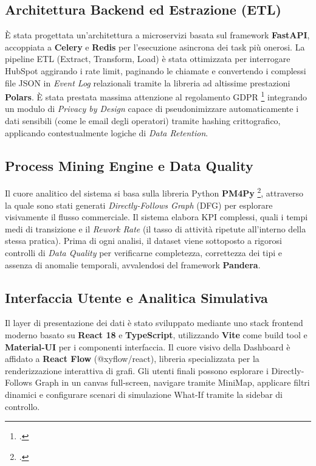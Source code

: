 \documentclass[12pt, a4paper]{report}
\begin{document}
\subsection*{Architettura Backend ed Estrazione (ETL)}
È stata progettata un'architettura a microservizi basata sul framework \textbf{FastAPI}, accoppiata a \textbf{Celery} e \textbf{Redis} per l'esecuzione asincrona dei task più onerosi. La pipeline ETL (Extract, Transform, Load) è stata ottimizzata per interrogare HubSpot aggirando i rate limit, paginando le chiamate e convertendo i complessi file JSON in \textit{Event Log} relazionali tramite la libreria ad altissime prestazioni \textbf{Polars}. È stata prestata massima attenzione al regolamento GDPR \footcite{gdpr} integrando un modulo di \textit{Privacy by Design} capace di pseudonimizzare automaticamente i dati sensibili (come le email degli operatori) tramite hashing crittografico, applicando contestualmente logiche di \textit{Data Retention}.

\subsection*{Process Mining Engine e Data Quality}
Il cuore analitico del sistema si basa sulla libreria Python \textbf{PM4Py} \footcite{pm4py}, attraverso la quale sono stati generati \textit{Directly-Follows Graph} (DFG) per esplorare visivamente il flusso commerciale. Il sistema elabora KPI complessi, quali i tempi medi di transizione e il \textit{Rework Rate} (il tasso di attività ripetute all'interno della stessa pratica). Prima di ogni analisi, il dataset viene sottoposto a rigorosi controlli di \textit{Data Quality} per verificarne completezza, correttezza dei tipi e assenza di anomalie temporali, avvalendosi del framework \textbf{Pandera}.

\subsection*{Interfaccia Utente e Analitica Simulativa}
Il layer di presentazione dei dati è stato sviluppato mediante uno stack frontend moderno basato su \textbf{React 18} e \textbf{TypeScript}, utilizzando \textbf{Vite} come build tool e \textbf{Material-UI} per i componenti interfaccia. Il cuore visivo della Dashboard è affidato a \textbf{React Flow} (@xyflow/react), libreria specializzata per la renderizzazione interattiva di grafi. Gli utenti finali possono esplorare i Directly-Follows Graph in un canvas full-screen, navigare tramite MiniMap, applicare filtri dinamici e configurare scenari di simulazione What-If tramite la sidebar di controllo.
\end{document}
